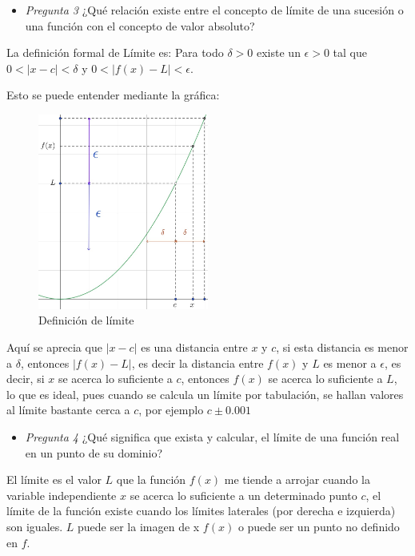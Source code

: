 \begin{itemize}
    \item \textit{Pregunta 3} ¿Qué relación existe entre el concepto de límite de una sucesión o una función con el concepto de valor absoluto?
\end{itemize}

La definición formal de Límite es: Para todo $\delta > 0$ existe un $\epsilon > 0$ tal que $0<|x-c|<\delta$ y $0<|f(x)-L|<\epsilon$.

Esto se puede entender mediante la gráfica:

\begin{figure}[H]
    \centering
    \includegraphics[width=0.5\textwidth]{images/geogebra/def_limite.jpeg}
    \caption{Definición de límite}
    \label{fig:def_limite}
\end{figure}

Aquí se aprecia que $|x-c|$ es una distancia entre $x$ y $c$, si esta distancia es menor a $\delta$, entonces $|f(x)-L|$, es decir la distancia entre $f(x)$ y $L$ es menor a $\epsilon$, es decir, si $x$ se acerca lo suficiente a $c$, entonces $f(x)$ se acerca lo suficiente a $L$, lo que es ideal, pues cuando se calcula un límite por tabulación, se hallan valores al límite bastante cerca a $c$, por ejemplo $c \pm 0.001$

\begin{itemize}
    \item \textit{Pregunta 4} ¿Qué significa que exista y calcular, el límite de una función real en un punto de su dominio?
\end{itemize}

El límite es el valor $L$ que la función $f(x)$ me tiende a arrojar cuando la variable independiente $x$ se acerca lo suficiente a un determinado punto $c$, el límite de la función existe cuando los límites laterales (por derecha e izquierda) son iguales. $L$ puede ser la imagen de x $f(x)$ o puede ser un punto no definido en $f$.

